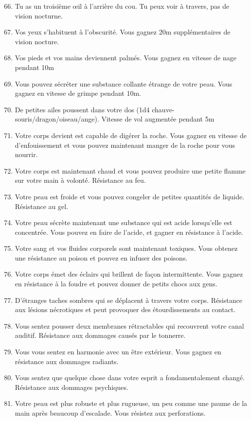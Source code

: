 \documentclass{article}
\begin{document}
\begin{enumerate}
	\setcounter{enumi}{65}
	\item Tu as un troisième œil à l'arrière du cou. Tu peux voir à travers, pas de vision nocturne.
	\item Vos yeux s'habituent à l'obscurité. Vous gagnez 20m supplémentaires de vision nocture.
	\item Vos pieds et vos mains deviennent palmés. Vous gagnez en vitesse de nage pendant 10m
	\item Vous pouvez sécréter une substance collante étrange de votre peau. Vous gagnez en vitesse de grimpe pendant 10m.
	\item De petites ailes poussent dans votre dos (1d4 chauve-souris/dragon/oiseau/ange). Vitesse de vol augmentée pendant 5m
	\item Votre corps devient est capable de digérer la roche. Vous gagnez en vitesse de d’enfouissement et vous pouvez maintenant manger de la roche pour vous nourrir.
	\item Votre corps est maintenant chaud et vous pouvez produire une petite flamme sur votre main à volonté. Résistance au feu.
	\item Votre peau est froide et vous pouvez congeler de petites quantités de liquide. Résistance au gel.
	\item Votre peau sécrète maintenant une substance qui est acide lorsqu'elle est concentrée. Vous pouvez en faire de l'acide, et gagner en résistance à l'acide.
	\item Votre sang et vos fluides corporels sont maintenant toxiques. Vous obtenez une résistance au poison et pouvez en infuser des poisons.
	\item Votre corps émet des éclairs qui brillent de façon intermittente. Vous gagnez en résistance à la foudre et pouvez donner de petits chocs aux gens.
	\item D'étranges taches sombres qui se déplacent à travers votre corps. Résistance aux lésions nécrotiques et peut provoquer des étourdissements au contact.
	\item Vous sentez pousser deux membranes rétractables qui recouvrent votre canal auditif. Résistance aux dommages causés par le tonnerre.
	\item Vous vous sentez en harmonie avec un être extérieur. Vous gagnez en résistance aux dommages radiants.
	\item Vous sentez que quelque chose dans votre esprit a fondamentalement changé. Résistance aux dommages psychiques.
	\item Votre peau est plus robuste et plus rugueuse, un peu comme une paume de la main après beaucoup d'escalade. Vous résistez aux perforations.

\end{enumerate}
\end{document}
